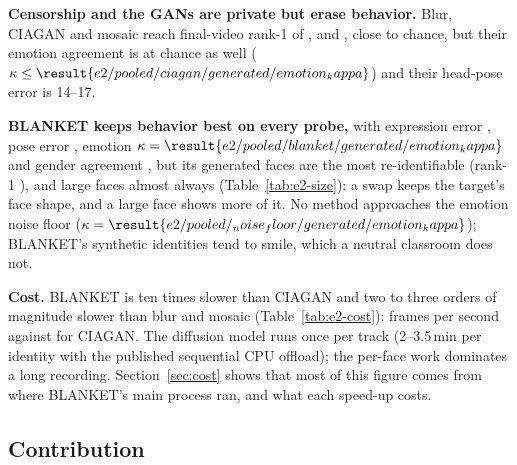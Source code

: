 \textbf{Censorship and the GANs are private but erase behavior.} Blur, CIAGAN and
mosaic reach final-video rank-1 of ,
 and
, close to chance, but their emotion
agreement is at chance as well ($\kappa \le \result{e2/pooled/ciagan/generated/emotion_kappa}$)
and their head-pose error is 14--17\textdegree.

\textbf{BLANKET keeps behavior best on every probe,} with expression error
, pose error
\textdegree{}, emotion
$\kappa = \result{e2/pooled/blanket/generated/emotion_kappa}$ and gender agreement
, but its generated faces are
the most re-identifiable (rank-1 ),
and large faces almost always (Table~\ref{tab:e2-size}): a swap keeps the
target's face shape, and a large face shows more of it. No method approaches
the emotion noise floor ($\kappa = \result{e2/pooled/_noise_floor/generated/emotion_kappa}$);
BLANKET's synthetic identities tend to smile, which a neutral classroom does not.

\textbf{Cost.} BLANKET is ten times slower than CIAGAN and two to three orders of
magnitude slower than blur and mosaic (Table~\ref{tab:e2-cost}):
 frames per second against
 for CIAGAN. The diffusion model runs once per
track (2--3.5\,min per identity with the published sequential CPU offload); the
per-face work dominates a long recording. Section~\ref{sec:cost} shows that most
of this figure comes from where BLANKET's main process ran, and what each
speed-up costs.

\subsection{Contribution}

\begin{table}[ht]\centering
\caption{C2: estimate of the real identity per aggregation mode, scored by its
cosine to the track's unseen frames.}
\label{tab:e3-identity}

\end{table}

\begin{table}[ht]\centering
\caption{Coverage: BLANKET as published, with several seed frames, and with
Stage~1's detection in the swap. Reasons a face is not generated, and FaceNet
rank-1 on the final video.}
\label{tab:e3-coverage}

\end{table}

